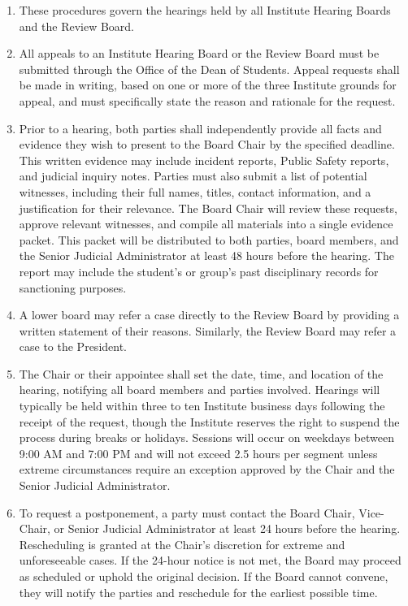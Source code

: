 \begin{enumerate}
    \item These procedures govern the hearings held by all Institute Hearing Boards and the Review Board.
    
    \item All appeals to an Institute Hearing Board or the Review Board must be submitted through the Office of the Dean of Students. Appeal requests shall be made in writing, based on one or more of the three Institute grounds for appeal, and must specifically state the reason and rationale for the request.
    
    \item Prior to a hearing, both parties shall independently provide all facts and evidence they wish to present to the Board Chair by the specified deadline. This written evidence may include incident reports, Public Safety reports, and judicial inquiry notes. Parties must also submit a list of potential witnesses, including their full names, titles, contact information, and a justification for their relevance. The Board Chair will review these requests, approve relevant witnesses, and compile all materials into a single evidence packet. This packet will be distributed to both parties, board members, and the Senior Judicial Administrator at least 48 hours before the hearing. The report may include the student's or group's past disciplinary records for sanctioning purposes.
    
    \item A lower board may refer a case directly to the Review Board by providing a written statement of their reasons. Similarly, the Review Board may refer a case to the President.
    
    \item The Chair or their appointee shall set the date, time, and location of the hearing, notifying all board members and parties involved. Hearings will typically be held within three to ten Institute business days following the receipt of the request, though the Institute reserves the right to suspend the process during breaks or holidays. Sessions will occur on weekdays between 9:00 AM and 7:00 PM and will not exceed 2.5 hours per segment unless extreme circumstances require an exception approved by the Chair and the Senior Judicial Administrator.
    
    \item To request a postponement, a party must contact the Board Chair, Vice-Chair, or Senior Judicial Administrator at least 24 hours before the hearing. Rescheduling is granted at the Chair's discretion for extreme and unforeseeable cases. If the 24-hour notice is not met, the Board may proceed as scheduled or uphold the original decision. If the Board cannot convene, they will notify the parties and reschedule for the earliest possible time.
    

\end{enumerate}
